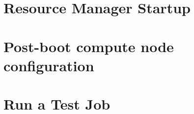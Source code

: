 \documentclass{ohpc-doc}
\begin{document}
\chapter{Resource Manager Startup} \label{sec:rms_startup}


\chapter{Post-boot compute node configuration} \label{sec:post_boot}


\chapter{Run a Test Job} \label{sec:test_job}


\appendix







\end{document}
